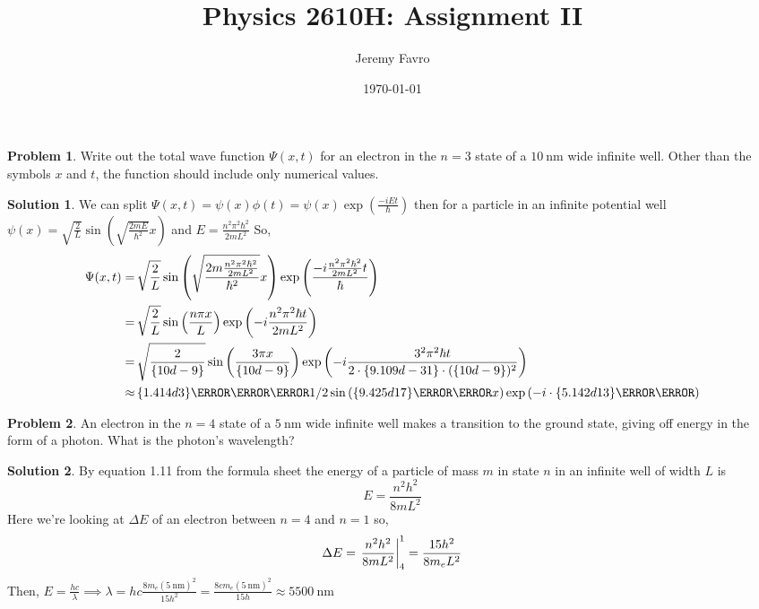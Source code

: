 \documentclass[10pt]{article}
\title{Physics 2610H: Assignment II}
\author{Jeremy Favro}
\date{\today}
\theoremstyle{definition}
\newtheorem{problem}{Problem}
\newtheorem{soln}{Solution}
\begin{document}
\maketitle

\begin{problem}
Write out the total wave function $\Psi(x, t)$ for an electron in the $n=3$ state of a $\qty{10}{\nano\meter}$ wide infinite well.
Other than the symbols $x$ and $t$, the function should include only numerical values.
\end{problem}
\begin{soln}
  We can split $\Psi(x, t)=\psi(x)\phi(t)=\psi(x)\exp\left(\frac{-iEt}{\hbar}\right)$ then for a particle in an infinite potential well
  $\psi(x)=\sqrt{\frac{2}{L}}\sin\left(\sqrt{\frac{2mE}{\hbar^2}}x\right)$ and $E=\frac{n^2\pi^2\hbar^2}{2mL^2}$ So,
  \begin{align*}
    \Psi(x, t) = &\,\sqrt{\frac{2}{L}}\sin\left(\sqrt{\frac{2m\frac{n^2\pi^2\hbar^2}{2mL^2}}{\hbar^2}}x\right)\exp\left(\frac{-i\frac{n^2\pi^2\hbar^2}{2mL^2}t}{\hbar}\right)\\
     = &\,\sqrt{\frac{2}{L}}\sin\left(\frac{n\pi x}{L}\right)\exp\left(-i\frac{n^2\pi^2\hbar t}{2mL^2}\right)\\
     = &\,\sqrt{\frac{2}{\qty{10d-9}{}}}\sin\left(\frac{3\pi x}{\qty{10d-9}{}}\right)\exp\left(-i\frac{3^2\pi^2\hbar t}{2\cdot\qty{9.109d-31}{}\cdot(\qty{10d-9})^2}\right)\\
     \approx &\,\qty{1.414d3}{\per\meter\tothe{1/2}}\sin\left(\qty{9.425d17}{\per\meter}x\right)\exp\left(-i\cdot \qty{5.142d13}{\per\second}\right)\\
  \end{align*}
\end{soln}

\begin{problem}
An electron in the $n=4$ state of a $\qty{5}{\nano\meter}$ wide infinite well makes a transition to the ground state,
giving off energy in the form of a photon. What is the photon's wavelength?
\end{problem}
\begin{soln} By equation 1.11 from the formula sheet the energy of a particle of mass $m$ in state $n$ in an infinite well of width $L$ is
  $$E=\frac{n^2h^2}{8mL^2}$$
  Here we're looking at $\Delta E$ of an electron between $n=4$ and $n=1$ so,
  $$\Delta E = \eval{\frac{n^2h^2}{8mL^2}}_{4}^{1}=\frac{15h^2}{8m_eL^2}$$
  Then, $\displaystyle E=\frac{hc}{\lambda}\implies \lambda = hc\frac{8m_e(\qty{5}{\nano\meter})^2}{15h^2}=\frac{8cm_e(\qty{5}{\nano\meter})^2}{15h}\approx \qty{5500}{\nano\meter}$
\end{soln}
\newpage
\end{document}
